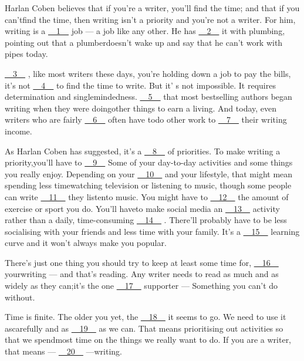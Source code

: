 Harlan Coben believes that if you're a writer, you'll find the time; and that if you can'tfind the time, then writing isn't a priority and you're not a writer. For him, writing is a \uline{~~1~~} job — a job like any other. He has \uline{~~2~~} it with plumbing, pointing out that a plumberdoesn't wake up and say that he can't work with pipes today.


\uline{~~3~~} , like most writers these days, you're holding down a job to pay the bills, it's not \uline{~~4~~} to find the time to write. But it' s not impossible. It requires determination and singlemindedness. \uline{~~5~~} that most bestselling authors began writing when they were doingother things to earn a living. And today, even writers who are fairly \uline{~~6~~} often have todo other work to \uline{~~7~~} their writing income.


As Harlan Coben has suggested, it's a \uline{~~8~~} of priorities. To make writing a priority,you'll have to \uline{~~9~~} Some of your day-to-day activities and some things you really enjoy. Depending on your \uline{~~10~~} and your lifestyle, that might mean spending less timewatching television or listening to music, though some people can write \uline{~~11~~} they listento music. You might have to \uline{~~12~~} the amount of exercise or sport you do. You'll haveto make social media an \uline{~~13~~} activity rather than a daily, time-consuming \uline{~~14~~} . There'll probably have to be less socialising with your friends and less time with your family. It's a \uline{~~15~~} learning curve and it won't always make you popular.


There's just one thing you should try to keep at least some time for, \uline{~~16~~} yourwriting — and that's reading. Any writer needs to read as much and as widely as they can;it's the one \uline{~~17~~} supporter — Something you can't do without.


Time is finite. The older you yet, the \uline{~~18~~} it seems to go. We need to use it ascarefully and as \uline{~~19~~} as we can. That means prioritising out activities so that we spendmost time on the things we really want to do. If you are a writer, that means — \uline{~~20~~} —writing.